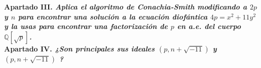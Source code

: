 \documentclass[fleqn]{article}
\def\Q{\mathds{Q}}
\begin{document}
    \newpage
    \textbf{Apartado III. \textit{Aplica el algoritmo de Conachia-Smith modificando a $2p$ y $n$ para encontrar
                                una solución a la ecuación diofántica $4p = x^2 + 11y^2 $ y la usas para encontrar 
                                una factorización de $p$ en a.e. del cuerpo $\Q[\sqrt{p}]$.}} \\


    \newpage
    \textbf{Apartado IV. \textit{¿Son principales sus ideales $(p, n+ \sqrt{-11})$ y $(p, n+ \sqrt{-11})$ ?}}\\
\end{document}
